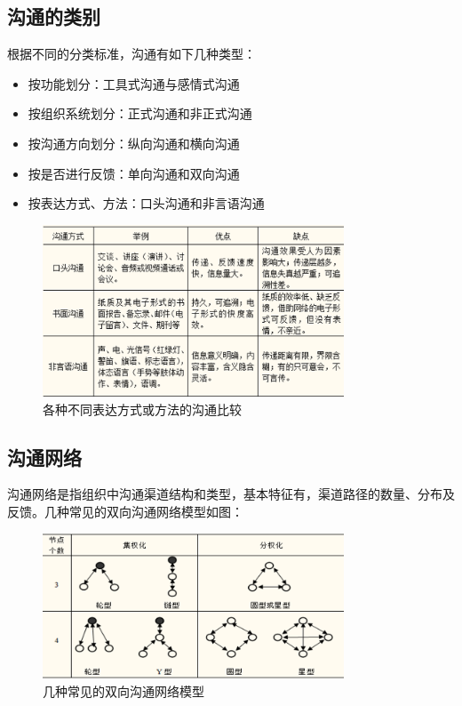 \subsection{沟通的类别}
根据不同的分类标准，沟通有如下几种类型：
\begin{itemize}
	\item 按功能划分：工具式沟通与感情式沟通
	\item 按组织系统划分：正式沟通和非正式沟通
	\item 按沟通方向划分：纵向沟通和横向沟通
	\item 按是否进行反馈：单向沟通和双向沟通
	\item 按表达方式、方法：口头沟通和非言语沟通
\end{itemize}
\begin{figure}[!h]
	\centering
	\includegraphics[width=0.8\textwidth]{image/9-2}
	\caption{各种不同表达方式或方法的沟通比较}
\end{figure}
\subsection{沟通网络}
沟通网络是指组织中沟通渠道结构和类型，基本特征有，渠道路径的数量、分布及反馈。几种常见的双向沟通网络模型如图：
\begin{figure}[!h]
	\centering
	\includegraphics[width=0.8\textwidth]{image/9-3}
	\caption{几种常见的双向沟通网络模型}
\end{figure}
